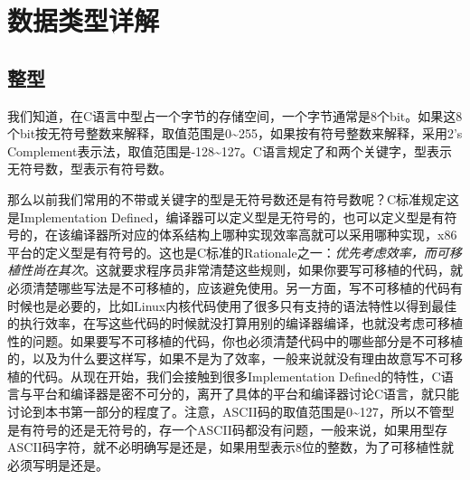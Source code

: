 

\chapter{数据类型详解}
%





\section{整型}
%
我们知道，在C语言中型占一个字节的存储空间，一个字节通常是8个bit。如果这8个bit按无符号整数来解释，取值范围是0\textasciitilde{}\BookSplit{}255，如果按有符号整数来解释，采用2's Complement表示法，取值范围是-128\textasciitilde{}\BookSplit{}127。C语言规定了和两个关键字，型表示无符号数，型表示有符号数。



那么以前我们常用的不带或关键字的型是无符号数还是有符号数呢？C标准规定这是Implementation Defined，编译器可以定义型是无符号的，也可以定义型是有符号的，在该编译器所对应的体系结构上哪种实现效率高就可以采用哪种实现，x86平台的定义型是有符号的。这也是C标准的Rationale之一：\emph{优先考虑效率，而可移植性尚在其次}。这就要求程序员非常清楚这些规则，如果你要写可移植的代码，就必须清楚哪些写法是不可移植的，应该避免使用。另一方面，写不可移植的代码有时候也是必要的，比如Linux内核代码使用了很多只有支持的语法特性以得到最佳的执行效率，在写这些代码的时候就没打算用别的编译器编译，也就没考虑可移植性的问题。如果要写不可移植的代码，你也必须清楚代码中的哪些部分是不可移植的，以及为什么要这样写，如果不是为了效率，一般来说就没有理由故意写不可移植的代码。从现在开始，我们会接触到很多Implementation Defined的特性，C语言与平台和编译器是密不可分的，离开了具体的平台和编译器讨论C语言，就只能讨论到本书第一部分的程度了。注意，ASCII码的取值范围是0\textasciitilde{}\BookSplit{}127，所以不管型是有符号的还是无符号的，存一个ASCII码都没有问题，一般来说，如果用型存ASCII码字符，就不必明确写是还是，如果用型表示8位的整数，为了可移植性就必须写明是还是。



